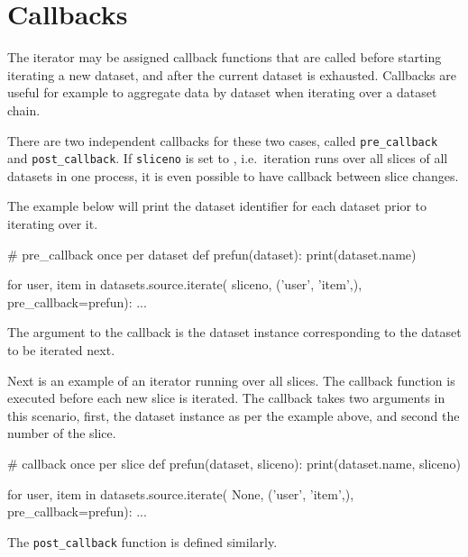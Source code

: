 \section{Callbacks}
\label{sec:callback}
The iterator may be assigned callback functions that are called before
starting iterating a new dataset, and after the current dataset is
exhausted.  Callbacks are useful for example to aggregate data by
dataset when iterating over a dataset chain.

There are two independent callbacks for these two cases,
called \texttt{pre\_callback} and \texttt{post\_callback}.
If \texttt{sliceno} is set to \pyNone, i.e.\ iteration runs over all
slices of all datasets in one process, it is even possible to have
callback between slice changes.

The example below will print the dataset identifier for each dataset
prior to iterating over it.
\begin{python}
# pre_callback once per dataset
def prefun(dataset):
    print(dataset.name)

for user, item in datasets.source.iterate(
                       sliceno, ('user', 'item',),
                       pre_callback=prefun):
    ...
\end{python}
The argument to the callback is the dataset instance corresponding to
the dataset to be iterated next.

Next is an example of an iterator running over all slices.  The
callback function is executed before each new slice is iterated.  The
callback takes two arguments in this scenario, first, the dataset
instance as per the example above, and second the number of the slice.
\begin{python}
# callback once per slice
def prefun(dataset, sliceno):
    print(dataset.name, sliceno)

for user, item in datasets.source.iterate(
                       None, ('user', 'item',),
                       pre_callback=prefun):
    ...
\end{python}
The \texttt{post\_callback} function is defined similarly.


